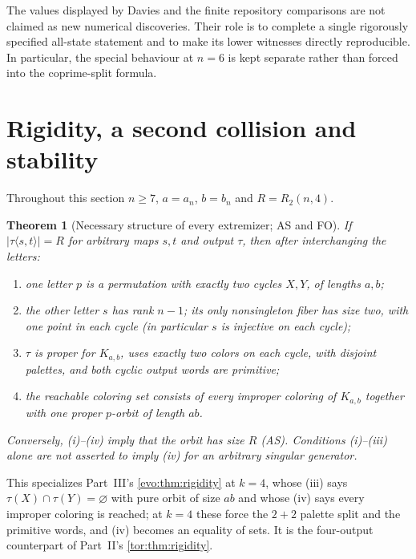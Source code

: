 \documentclass[11pt,a4paper]{article}
\numberwithin{equation}{section}
\newtheorem{theorem}{Theorem}[section]
\theoremstyle{definition}
\theoremstyle{remark}
\begin{document}
\begin{remark}\label{fo:as:rem:small}
The values displayed by Davies and the finite repository comparisons are not
claimed as new numerical discoveries. Their role is to complete a single
rigorously specified all-state statement and to make its lower witnesses
directly reproducible. In particular, the special behaviour at $n=6$ is kept
separate rather than forced into the coprime-split formula.
\end{remark}

\section{Rigidity, a second collision and stability}\label{fo:sec:rigidity}

Throughout this section $n\ge7$, $a=a_n$, $b=b_n$ and $R=R_2(n,4)$.

\begin{theorem}[Necessary structure of every extremizer; AS and FO]\label{fo:thm:rigidity}
If $|\tau\langle s,t\rangle|=R$ for arbitrary maps $s,t$ and output $\tau$,
then after interchanging the letters:
\begin{enumerate}[label=(\roman*)]
\item one letter $p$ is a permutation with exactly two cycles $X,Y$, of
lengths $a,b$;
\item the other letter $s$ has rank $n-1$; its only nonsingleton fiber has
size two, with one point in each cycle (in particular $s$ is injective on
each cycle);
\item $\tau$ is proper for $K_{a,b}$, uses exactly two colors on each cycle,
with disjoint palettes, and both cyclic output words are primitive;
\item the reachable coloring set consists of every improper coloring of
$K_{a,b}$ together with one proper $p$-orbit of length $ab$.
\end{enumerate}
Conversely, \textup{(i)--(iv)} imply that the orbit has size $R$ \textup{(AS)}.
Conditions \textup{(i)--(iii)} alone are not asserted to imply \textup{(iv)} for
an arbitrary singular generator.
\end{theorem}

This specializes Part~III's \cref{evo:thm:rigidity} at $k=4$, whose (iii)
says $\tau(X)\cap\tau(Y)=\varnothing$ with pure orbit of size $ab$ and whose
(iv) says every improper coloring is reached; at $k=4$ these force the
$2+2$ palette split and the primitive words, and (iv) becomes an equality of
sets. It is the four-output counterpart of Part~II's
\cref{tor:thm:rigidity}.
\end{document}
